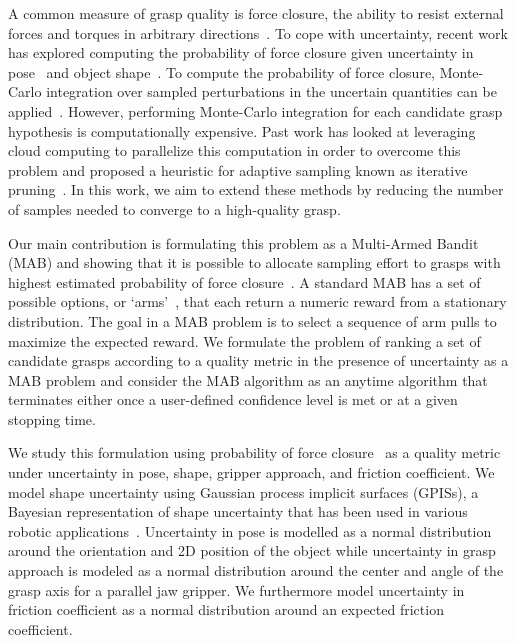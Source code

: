 \documentclass[10pt, conference]{ieeeconf}      %
\begin{document}
A common measure of grasp quality is force closure, the ability to resist external forces and torques in arbitrary directions~\cite{li1988task}. To cope with uncertainty, recent work has explored computing the probability of force closure given uncertainty in pose~\cite{christopoulos2007handling, kim2012physically, weisz2012pose} and object shape~\cite{kehoe2012estimating, mahler2015gp}.
To compute the probability of force closure, Monte-Carlo integration over sampled perturbations in the uncertain
quantities can be applied~\cite{christopoulos2007handling,kehoe2012toward, kim2012physically, weisz2012pose}. However,
performing Monte-Carlo integration for each candidate grasp hypothesis is computationally expensive.  Past work has
looked at leveraging cloud computing to parallelize this computation in order to overcome this problem and proposed a heuristic for adaptive sampling known as iterative pruning~\cite{kehoe2012estimating,kehoe2012toward,kehoe2015survey}.
In this work, we aim to extend these methods by reducing the number of samples needed to converge to a high-quality grasp.  

Our main contribution is formulating this problem as a Multi-Armed Bandit (MAB) and showing that it is possible to
allocate sampling effort to grasps with highest estimated probability of force closure~\cite{barto1998reinforcement,
lai1985asymptotically, robbins1985some}. A standard MAB has a set of possible options, or
`arms'~\cite{barto1998reinforcement}, that each return a numeric reward from a stationary distribution. The goal in a
MAB problem is to  select a sequence of arm pulls to maximize the expected reward. We formulate the problem of ranking a
set of candidate grasps according to a quality metric in the presence of uncertainty as a MAB problem and consider the
MAB algorithm as an anytime algorithm that terminates either once a user-defined confidence level is met or at a given stopping time. 

We study this formulation using probability of force closure~\cite{christopoulos2007handling, weisz2012pose, kehoe2012toward} as a quality metric under uncertainty in pose, shape, gripper approach, and friction coefficient. 
We model shape uncertainty using Gaussian process implicit surfaces (GPISs), a Bayesian representation of shape uncertainty that has been used in various robotic applications~\cite{dragiev2011, hollinger2013}. 
Uncertainty in pose is modelled as a normal distribution around the orientation and 2D position of the object while
uncertainty in grasp approach is modeled as a normal distribution around the center and angle of the grasp axis for a
parallel jaw gripper. We furthermore model uncertainty in friction coefficient as a normal distribution around an expected friction coefficient.
\end{document}
